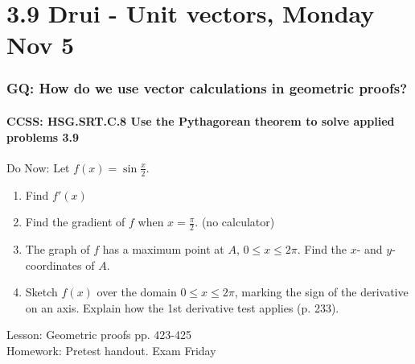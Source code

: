 \documentclass{beamer}
\begin{document}
\section{3.9 Drui - Unit vectors, Monday Nov 5}
  \frame
  {
    \frametitle{GQ: How do we use vector calculations in geometric proofs?}
    \framesubtitle{CCSS: HSG.SRT.C.8 Use the Pythagorean theorem to solve applied problems \qquad \alert{3.9}}
    \begin{block}{Do Now: Let $\displaystyle f(x)= \sin \frac{x}{2}$.}
    \begin{enumerate}
        \item Find $f'(x)$
        \item Find the gradient of $f$ when $x= \frac{\pi}{2}$. (no calculator)
        \item The graph of $f$ has a maximum point at $A$, $0 \leq x \leq 2\pi$. Find the $x$- and $y$-coordinates of $A$.
        \item Sketch $f(x)$ over the domain $0 \leq x \leq 2\pi$, marking the sign of the derivative on an axis. Explain how the 1st derivative test applies (p. 233).
    \end{enumerate}
    \end{block}

    Lesson: Geometric proofs pp. 423-425\\ \bigskip
    Homework: Pretest handout. \alert{Exam Friday}
  }
\end{document}
